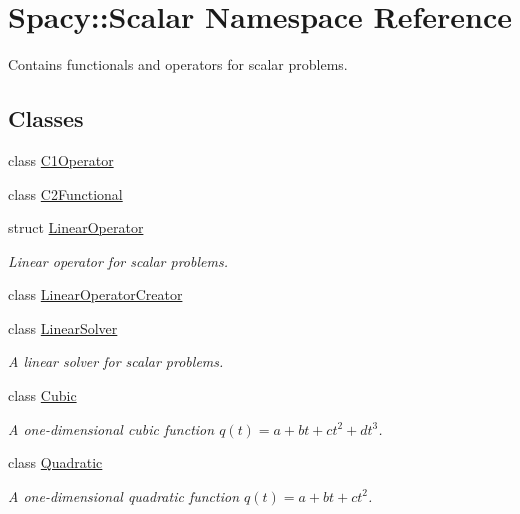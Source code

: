 \hypertarget{namespaceSpacy_1_1Scalar}{\section{\-Spacy\-:\-:\-Scalar \-Namespace \-Reference}
\label{namespaceSpacy_1_1Scalar}
}


\-Contains functionals and operators for scalar problems.  


\subsection*{\-Classes}
\begin{DoxyCompactItemize}
\item 
class \hyperlink{classSpacy_1_1Scalar_1_1C1Operator}{\-C1\-Operator}
\item 
class \hyperlink{classSpacy_1_1Scalar_1_1C2Functional}{\-C2\-Functional}
\item 
struct \hyperlink{structSpacy_1_1Scalar_1_1LinearOperator}{\-Linear\-Operator}
\begin{DoxyCompactList}\small\item\em \-Linear operator for scalar problems. \end{DoxyCompactList}\item 
class \hyperlink{classSpacy_1_1Scalar_1_1LinearOperatorCreator}{\-Linear\-Operator\-Creator}
\item 
class \hyperlink{classSpacy_1_1Scalar_1_1LinearSolver}{\-Linear\-Solver}
\begin{DoxyCompactList}\small\item\em \-A linear solver for scalar problems. \end{DoxyCompactList}\item 
class \hyperlink{classSpacy_1_1Scalar_1_1Cubic}{\-Cubic}
\begin{DoxyCompactList}\small\item\em \-A one-\/dimensional cubic function $q(t) = a + bt + ct^2 + dt^3$. \end{DoxyCompactList}\item 
class \hyperlink{classSpacy_1_1Scalar_1_1Quadratic}{\-Quadratic}
\begin{DoxyCompactList}\small\item\em \-A one-\/dimensional quadratic function $q(t) = a + bt + ct^2$. \end{DoxyCompactList}\end{DoxyCompactItemize}
